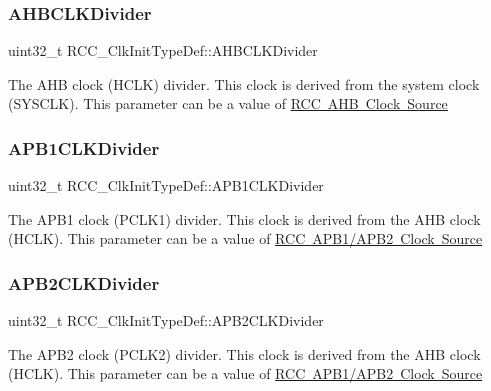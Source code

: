 \subsubsection{\texorpdfstring{AHBCLKDivider}{AHBCLKDivider}}
{\footnotesize\ttfamily uint32\+\_\+t R\+C\+C\+\_\+\+Clk\+Init\+Type\+Def\+::\+A\+H\+B\+C\+L\+K\+Divider}

The A\+HB clock (H\+C\+LK) divider. This clock is derived from the system clock (S\+Y\+S\+C\+LK). This parameter can be a value of \mbox{\hyperlink{group___r_c_c___a_h_b___clock___source}{R\+CC A\+HB Clock Source}} \mbox{\label{struct_r_c_c___clk_init_type_def_a21ceb024102adc3c4dc7eb270cf02ebd}} 
\subsubsection{\texorpdfstring{APB1CLKDivider}{APB1CLKDivider}}
{\footnotesize\ttfamily uint32\+\_\+t R\+C\+C\+\_\+\+Clk\+Init\+Type\+Def\+::\+A\+P\+B1\+C\+L\+K\+Divider}

The A\+P\+B1 clock (P\+C\+L\+K1) divider. This clock is derived from the A\+HB clock (H\+C\+LK). This parameter can be a value of \mbox{\hyperlink{group___r_c_c___a_p_b1___a_p_b2___clock___source}{R\+CC A\+P\+B1/\+A\+P\+B2 Clock Source}} \mbox{\label{struct_r_c_c___clk_init_type_def_aa75c110cd93855d49249f38da8cf94f7}} 
\subsubsection{\texorpdfstring{APB2CLKDivider}{APB2CLKDivider}}
{\footnotesize\ttfamily uint32\+\_\+t R\+C\+C\+\_\+\+Clk\+Init\+Type\+Def\+::\+A\+P\+B2\+C\+L\+K\+Divider}

The A\+P\+B2 clock (P\+C\+L\+K2) divider. This clock is derived from the A\+HB clock (H\+C\+LK). This parameter can be a value of \mbox{\hyperlink{group___r_c_c___a_p_b1___a_p_b2___clock___source}{R\+CC A\+P\+B1/\+A\+P\+B2 Clock Source}} \mbox{\label{struct_r_c_c___clk_init_type_def_a93a53676a1cfc5b55b8b990e7ff4dac5}} 
